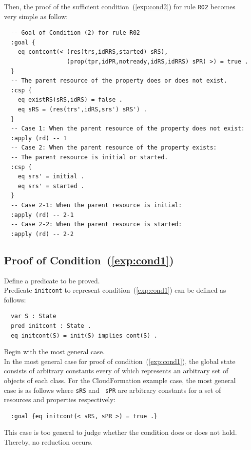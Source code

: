 \documentclass[12pt]{report}
\begin{document}
\normalsize
Then, the proof of the sufficient condition~(\ref{exp:cond2}) for rule
{\tt R02} becomes very simple as follow:
\small
\begin{verbatim}
  -- Goal of Condition (2) for rule R02
  :goal {
    eq contcont(< (res(trs,idRRS,started) sRS),
                  (prop(tpr,idPR,notready,idRS,idRRS) sPR) >) = true .
  }
  -- The parent resource of the property does or does not exist.
  :csp {
    eq existRS(sRS,idRS) = false .
    eq sRS = (res(trs',idRS,srs') sRS') .
  }
  -- Case 1: When the parent resource of the property does not exist:
  :apply (rd) -- 1
  -- Case 2: When the parent resource of the property exists:
  -- The parent resource is initial or started.
  :csp {
    eq srs' = initial .
    eq srs' = started .
  }
  -- Case 2-1: When the parent resource is initial:
  :apply (rd) -- 2-1
  -- Case 2-2: When the parent resource is started:
  :apply (rd) -- 2-2
\end{verbatim}
\normalsize

\subsection{Proof of Condition~(\ref{exp:cond1})}
\label{sec:TOSCAinitcont}
 Define a predicate to be proved. \\
Predicate {\tt initcont} to represent condition~(\ref{exp:cond1}) can be defined as follows:
\small
\begin{verbatim}
  var S : State
  pred initcont : State .
  eq initcont(S) = init(S) implies cont(S) .
\end{verbatim}
\normalsize

 Begin with the most general case. \\ In the
most general case for proof of condition~(\ref{exp:cond1}), the global
state consists of arbitrary constants every of which represents an
arbitrary set of objects of each class. For the CloudFormation example
case, the most general case is as follows where {\tt sRS} and {\tt
  sPR} are arbitrary constants for a set of resources and properties
respectively:
\small
\begin{verbatim}
  :goal {eq initcont(< sRS, sPR >) = true .}
\end{verbatim}
\normalsize
This case is too general to judge whether the condition does or does
not hold. Thereby, no reduction occurs.\\
\end{document}
